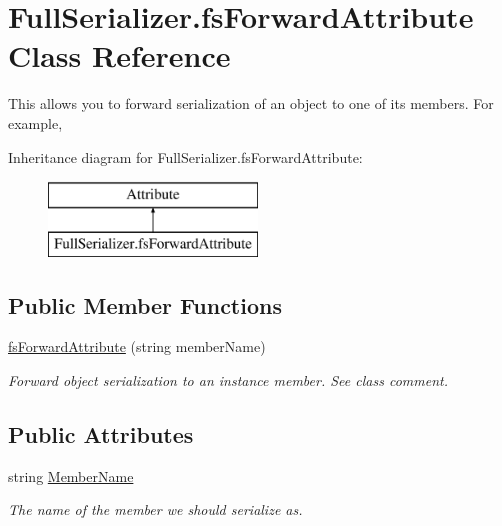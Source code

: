 \hypertarget{class_full_serializer_1_1fs_forward_attribute}{}\section{Full\+Serializer.\+fs\+Forward\+Attribute Class Reference}
\label{class_full_serializer_1_1fs_forward_attribute}


This allows you to forward serialization of an object to one of its members. For example,  


Inheritance diagram for Full\+Serializer.\+fs\+Forward\+Attribute\+:\begin{figure}[H]
\begin{center}
\leavevmode
\includegraphics[height=2.000000cm]{class_full_serializer_1_1fs_forward_attribute}
\end{center}
\end{figure}
\subsection*{Public Member Functions}
\begin{DoxyCompactItemize}
\item 
\hyperlink{class_full_serializer_1_1fs_forward_attribute_a91c4c1907419cf137910faf2e650b194}{fs\+Forward\+Attribute} (string member\+Name)
\begin{DoxyCompactList}\small\item\em Forward object serialization to an instance member. See class comment. \end{DoxyCompactList}\end{DoxyCompactItemize}
\subsection*{Public Attributes}
\begin{DoxyCompactItemize}
\item 
string \hyperlink{class_full_serializer_1_1fs_forward_attribute_a25f1793738313ab75cc7539ac582cce6}{Member\+Name}
\begin{DoxyCompactList}\small\item\em The name of the member we should serialize as. \end{DoxyCompactList}\end{DoxyCompactItemize}


